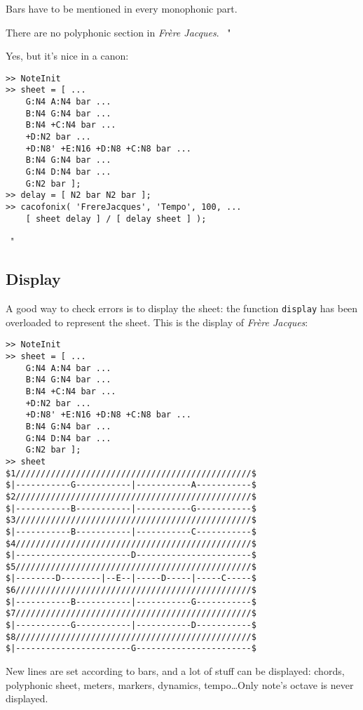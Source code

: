 \documentclass{article}
\newcommand\frerejaques{\emph{Fr\`ere Jacques}\xspace}
\newenvironment{meenv}{ \par \noindent \makebox[6em][r]{ \textcolor{mecolor}{Me}: " --~}}{~"}
\newenvironment{myselfenv}{ \par \noindent \makebox[6em][r]{ \textcolor{myselfcolor}{Myself}: " --~}}{~"}
\newcommand{ \me }[1]{%
\begin{meenv}%
	#1%
\end{meenv} }
\begin{document}
Bars have to be mentioned in every monophonic part.

\me{ There are no polyphonic section in \frerejaques. }
\begin{myselfenv}
Yes, but it's nice in a canon:

\begin{lstlisting}
>> NoteInit
>> sheet = [ ...
	G:N4 A:N4 bar ...
	B:N4 G:N4 bar ...
	B:N4 +C:N4 bar ...
	+D:N2 bar ...
	+D:N8' +E:N16 +D:N8 +C:N8 bar ...
	B:N4 G:N4 bar ...
	G:N4 D:N4 bar ...
	G:N2 bar ];
>> delay = [ N2 bar N2 bar ];
>> cacofonix( 'FrereJacques', 'Tempo', 100, ...
	[ sheet delay ] / [ delay sheet ] );
\end{lstlisting}

\end{myselfenv}

\subsection{Display}

A good way to check errors is to display the sheet: the function \lstinline!display! has been overloaded to represent the sheet. This is the display of \frerejaques:
\begin{lstlisting}
>> NoteInit
>> sheet = [ ...
	G:N4 A:N4 bar ...
	B:N4 G:N4 bar ...
	B:N4 +C:N4 bar ...
	+D:N2 bar ...
	+D:N8' +E:N16 +D:N8 +C:N8 bar ...
	B:N4 G:N4 bar ...
	G:N4 D:N4 bar ...
	G:N2 bar ];
>> sheet
$1///////////////////////////////////////////////$
$|-----------G-----------|-----------A-----------$
$2///////////////////////////////////////////////$
$|-----------B-----------|-----------G-----------$
$3///////////////////////////////////////////////$
$|-----------B-----------|-----------C-----------$
$4///////////////////////////////////////////////$
$|-----------------------D-----------------------$
$5///////////////////////////////////////////////$
$|--------D--------|--E--|-----D-----|-----C-----$
$6///////////////////////////////////////////////$
$|-----------B-----------|-----------G-----------$
$7///////////////////////////////////////////////$
$|-----------G-----------|-----------D-----------$
$8///////////////////////////////////////////////$
$|-----------------------G-----------------------$
\end{lstlisting}

New lines are set according to bars, and a lot of stuff can be displayed: chords, polyphonic sheet, meters, markers, dynamics, tempo\dots Only note's octave is never displayed.
\end{document}
